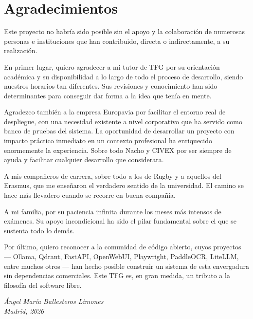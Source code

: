 \chapter*{Agradecimientos}

Este proyecto no habría sido posible sin el apoyo y la colaboración de numerosas personas e instituciones que han contribuido, directa o indirectamente, a su realización.

En primer lugar, quiero agradecer a mi tutor de TFG por su orientación académica y su disponibilidad a lo largo de todo el proceso de desarrollo, siendo nuestros horarios tan diferentes. Sus revisiones y conocimiento han sido determinantes para conseguir dar forma a la idea que tenía en mente.

Agradezco también a la empresa Europavia por facilitar el entorno real de despliegue, con una necesidad existente a nivel corporativo que ha servido como banco de pruebas del sistema. La oportunidad de desarrollar un proyecto con impacto práctico inmediato en un contexto profesional ha enriquecido enormemente la experiencia. Sobre todo Nacho y CIVEX por ser siempre de ayuda y facilitar cualquier desarrollo que considerara.

A mis compañeros de carrera, sobre todo a los de Rugby y a aquellos del Erasmus, que me enseñaron el verdadero sentido de la universidad. El camino se hace más llevadero cuando se recorre en buena compañía.

A mi familia, por su paciencia infinita durante los meses más intensos de exámenes. Su apoyo incondicional ha sido el pilar fundamental sobre el que se sustenta todo lo demás.

Por último, quiero reconocer a la comunidad de código abierto, cuyos proyectos --- Ollama, Qdrant, FastAPI, OpenWebUI, Playwright, PaddleOCR, LiteLLM, entre muchos otros --- han hecho posible construir un sistema de esta envergadura sin dependencias comerciales. Este TFG es, en gran medida, un tributo a la filosofía del software libre.

\vspace{1cm}
\begin{flushright}
\textit{Ángel María Ballesteros Limones}\\
\textit{Madrid, 2026}
\end{flushright}
\newpage
